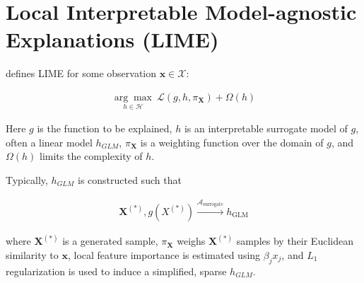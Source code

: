 \documentclass{article}
\begin{document}
\section{Local Interpretable Model-agnostic Explanations (LIME)}
\label{sec:lime}

\cite{lime} defines LIME for some observation $\mathbf{x} \in \mathcal{X}$:

\begin{equation}
\begin{aligned}
\underset{h \in \mathcal{H}}{\arg\max}\:\mathcal{L}(g, h, \pi_{\mathbf{X}}) + \Omega(h)
\end{aligned}
\end{equation}

Here $g$ is the function to be explained, $h$ is an interpretable surrogate model of $g$, often a linear model $h_{GLM}$, $\pi_{\mathbf{X}}$ is a weighting function over the domain of $g$, and $\Omega(h)$ limits the complexity of $h$.

\vspace{5pt}

Typically, $h_{GLM}$ is constructed such that

\begin{equation}
\begin{aligned}
\mathbf{X}^{(*)}, g({X}^{(*)}) \xrightarrow{\mathcal{A}_{\text{surrogate}}} h_{\text{GLM}}
\end{aligned}
\end{equation}

where $\mathbf{X}^{(*)}$ is a generated sample, $\pi_{\mathbf{X}}$ weighs $\mathbf{X}^{(*)}$ samples by their Euclidean similarity to $\mathbf{x}$, local feature importance is estimated using $\beta_j x_j$, and $L_1$ regularization is used to induce a simplified, sparse $h_{GLM}$. 		
\end{document}
